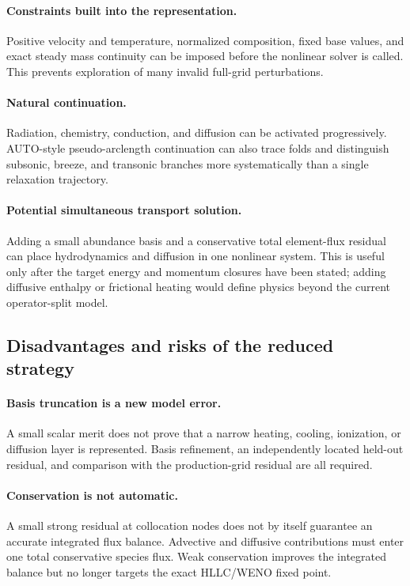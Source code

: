 \documentclass[english,a4paper]{my_memo}
\begin{document}
\paragraph{Constraints built into the representation.}
Positive velocity and temperature, normalized composition, fixed base values,
and exact steady mass continuity can be imposed before the nonlinear solver is
called.  This prevents exploration of many invalid full-grid perturbations.

\paragraph{Natural continuation.}
Radiation, chemistry, conduction, and diffusion can be activated progressively.
AUTO-style pseudo-arclength continuation can also trace folds and distinguish
subsonic, breeze, and transonic branches more systematically than a single
relaxation trajectory.

\paragraph{Potential simultaneous transport solution.}
Adding a small abundance basis and a conservative total element-flux residual
can place hydrodynamics and diffusion in one nonlinear system.  This is useful
only after the target energy and momentum closures have been stated; adding
diffusive enthalpy or frictional heating would define physics beyond the current
operator-split model.

\subsection{Disadvantages and risks of the reduced strategy}

\paragraph{Basis truncation is a new model error.}
A small scalar merit does not prove that a narrow heating, cooling, ionization,
or diffusion layer is represented.  Basis refinement, an independently located
held-out residual, and comparison with the production-grid residual are all
required.

\paragraph{Conservation is not automatic.}
A small strong residual at collocation nodes does not by itself guarantee an
accurate integrated flux balance.  Advective and diffusive contributions must
enter one total conservative species flux.  Weak conservation improves the
integrated balance but no longer targets the exact HLLC/WENO fixed point.
\end{document}
